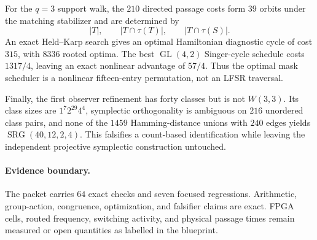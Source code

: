 For the $q=3$ support walk, the $210$ directed passage costs form $39$ orbits under the
matching stabilizer and are determined by
\[
 |T|,\qquad |T\cap\tau(T)|,\qquad |T\cap\tau(S)|.
\]
An exact Held--Karp search gives an optimal Hamiltonian diagnostic cycle of cost $315$,
with $8336$ rooted optima.  The best $\operatorname{GL}(4,2)$ Singer-cycle schedule costs
$1317/4$, leaving an exact nonlinear advantage of $57/4$.  Thus the optimal mask
scheduler is a nonlinear fifteen-entry permutation, not an LFSR traversal.

Finally, the first observer refinement has forty classes but is not $W(3,3)$.  Its class
sizes are $1^7 2^{29}4^4$, symplectic orthogonality is ambiguous on $216$ unordered class
pairs, and none of the $1459$ Hamming-distance unions with $240$ edges yields
$\operatorname{SRG}(40,12,2,4)$.  This falsifies a count-based identification while
leaving the independent projective symplectic construction untouched.

\paragraph{Evidence boundary.}
The packet carries $64$ exact checks and seven focused regressions.  Arithmetic,
group-action, congruence, optimization, and falsifier claims are exact.  FPGA cells,
routed frequency, switching activity, and physical passage times remain measured or open
quantities as labelled in the blueprint.
